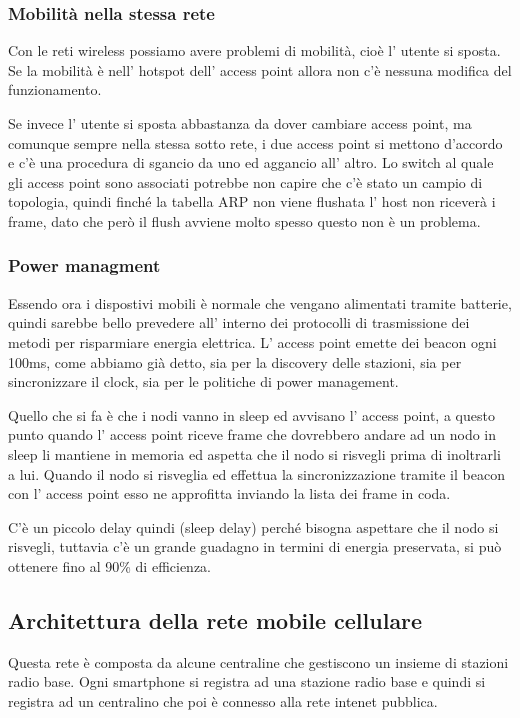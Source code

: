\subsubsection{Mobilità nella stessa rete}
Con le reti wireless possiamo avere problemi di mobilità, cioè l' utente si sposta.
Se la mobilità è nell' hotspot dell' access point allora non c'è nessuna modifica del funzionamento.

Se invece l' utente si sposta abbastanza da dover cambiare access point, ma comunque sempre nella stessa sotto rete, i due access point si mettono d'accordo e c'è una procedura di sgancio da uno ed aggancio all' altro.
Lo switch al quale gli access point sono associati potrebbe non capire che c'è stato un campio di topologia, quindi finché la tabella ARP non viene flushata l' host non riceverà i frame, dato che però il flush avviene molto spesso questo non è un problema.

\subsubsection{Power managment}
Essendo ora i dispostivi mobili è normale che vengano alimentati tramite batterie, quindi sarebbe bello prevedere all' interno dei protocolli di trasmissione dei metodi per risparmiare energia elettrica.
L' access point emette dei beacon ogni 100ms, come abbiamo già detto, sia per la discovery delle stazioni, sia per sincronizzare il clock, sia per le politiche di power management.

Quello che si fa è che i nodi vanno in sleep ed avvisano l' access point, a questo punto quando l' access point riceve frame che dovrebbero andare ad un nodo in sleep li mantiene in memoria ed aspetta che il nodo si risvegli prima di inoltrarli a lui.
Quando il nodo si risveglia ed effettua la sincronizzazione tramite il beacon con l' access point esso ne approfitta inviando la lista dei frame in coda.

C'è un piccolo delay quindi (sleep delay) perché bisogna aspettare che il nodo si risvegli, tuttavia c'è un grande guadagno in termini di energia preservata, si può ottenere fino al 90\% di efficienza.

\subsection{Architettura della rete mobile cellulare}
Questa rete è composta da alcune centraline che gestiscono un insieme di stazioni radio base.
Ogni smartphone si registra ad una stazione radio base e quindi si registra ad un centralino che poi è connesso alla rete intenet pubblica.

